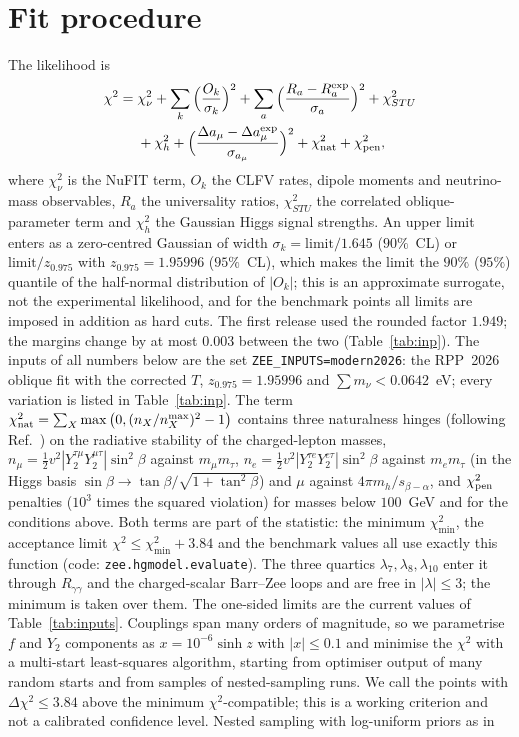 \documentclass[twocolumn,epjc3]{svjour3}
\newcommand{\HG}{Ref.~\cite{HerreroGarcia:2017xdq}}
\begin{document}
\section{Fit procedure}\label{sec:fit}
The likelihood is
\begin{equation}
\begin{split}
\chi^2={}&\chi^2_\nu+\sum_k\Big(\frac{O_k}{\sigma_k}\Big)^2+\sum_{a}\Big(\frac{R_a-R_a^{\rm exp}}{\sigma_a}\Big)^2+\chi^2_{STU}\\
&+\chi^2_h+\Big(\frac{\Delta a_\mu-\Delta a_\mu^{\rm exp}}{\sigma_{a_\mu}}\Big)^2+\chi^2_{\rm nat}+\chi^2_{\rm pen},
\end{split}\label{eq:chi2}
\end{equation}
where $\chi^2_\nu$ is the NuFIT term, $O_k$ the CLFV rates, dipole moments and neutrino-mass observables, $R_a$ the universality ratios, $\chi^2_{STU}$ the correlated oblique-parameter term and $\chi^2_h$ the Gaussian Higgs signal strengths. An upper limit enters as a zero-centred Gaussian of width $\sigma_k=\text{limit}/1.645$ ($90\%$~CL) or $\text{limit}/z_{0.975}$ with $z_{0.975}=1.95996$ ($95\%$~CL), which makes the limit the $90\%$ ($95\%$) quantile of the half-normal distribution of $|O_k|$; this is an approximate surrogate, not the experimental likelihood, and for the benchmark points all limits are imposed in addition as hard cuts. The first release used the rounded factor $1.949$; the margins change by at most $0.003$ between the two (Table~\ref{tab:inp}). The inputs of all numbers below are the set \texttt{ZEE\_INPUTS=modern2026}: the RPP~2026 oblique fit with the corrected $T$, $z_{0.975}=1.95996$ and $\sum m_\nu<0.0642$~eV; every variation is listed in Table~\ref{tab:inp}. The term $\chi^2_{\rm nat}=\sum_{X}\max\big(0,(n_X/n_X^{\max})^2-1\big)$ contains three naturalness hinges (following \HG{}) on the radiative stability of the charged-lepton masses, $n_\mu=\tfrac12v^2|Y_2^{\tau\mu}Y_2^{\mu\tau}|\sin^2\!\beta$ against $m_\mu m_\tau$, $n_e=\tfrac12v^2|Y_2^{\tau e}Y_2^{e\tau}|\sin^2\!\beta$ against $m_em_\tau$ (in the Higgs basis $\sin\beta\to\tan\beta/\sqrt{1+\tan^2\beta}$) and $\mu$ against $4\pi m_h/s_{\beta-\alpha}$, and $\chi^2_{\rm pen}$ penalties ($10^3$ times the squared violation) for masses below $100$~GeV and for the conditions above. Both terms are part of the statistic: the minimum $\chi^2_{\min}$, the acceptance limit $\chi^2\le\chi^2_{\min}+3.84$ and the benchmark values all use exactly this function (code: \texttt{zee.hgmodel.evaluate}). The three quartics $\lambda_7,\lambda_8,\lambda_{10}$ enter it through $R_{\gamma\gamma}$ and the charged-scalar Barr--Zee loops and are free in $|\lambda|\le3$; the minimum is taken over them. The one-sided limits are the current values of Table~\ref{tab:inputs}. Couplings span many orders of magnitude, so we parametrise $f$ and $Y_2$ components as $x=10^{-6}\sinh z$ with $|x|\le0.1$ and minimise the $\chi^2$ with a multi-start least-squares algorithm, starting from optimiser output of many random starts and from samples of nested-sampling runs. We call the points with $\Delta\chi^2\le3.84$ above the minimum $\chi^2$-compatible; this is a working criterion and not a calibrated confidence level. Nested sampling with log-uniform priors as in 
\end{document}
